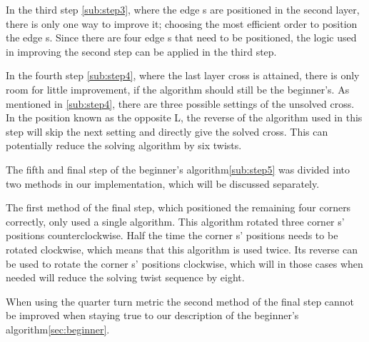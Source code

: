 In the third step \ref{sub:step3}, where the edge \cpiece{}s are positioned in the second layer, there is only one way to improve it; choosing the most efficient order to position the edge \cpiece{}s. Since there are four edge \cpiece{}s that need to be positioned, the logic used in improving the second step can be applied in the third step.

In the fourth step \ref{sub:step4}, where the last layer cross is attained, there is only room for little improvement, if the algorithm should still be the beginner's. As mentioned in \ref{sub:step4}, there are three possible settings of the unsolved cross. In the position known as the opposite L, the reverse of the algorithm used in this step will skip the next setting and directly give the solved cross. This can potentially reduce the solving algorithm by six twists.


The fifth and final step of the beginner's algorithm\ref{sub:step5} was divided into two methods in our implementation, which will be discussed separately.


The first method of the final step, which positioned the remaining four corners correctly, only used a single algorithm. This algorithm rotated three corner \cpiece{}s' positions counterclockwise. Half the time the corner \cpiece{}s' positions needs to be rotated clockwise, which means that this algorithm is used twice. Its reverse can be used to rotate the corner \cpiece{}s' positions clockwise, which will in those cases when needed will reduce the solving twist sequence by eight.

When using the quarter turn metric the second method of the final step cannot be improved when staying true to our description of the beginner's algorithm\ref{sec:beginner}.